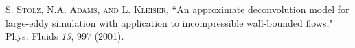 


\begin{thebibliography}{99}

 \textsc {S. Stolz, N.A. Adams, and L. Kleiser,}  ``An approximate deconvolution model for large-eddy simulation with application to incompressible wall-bounded flows," Phys. Fluids \emph{13}, 997 (2001).

 
\end{thebibliography}
